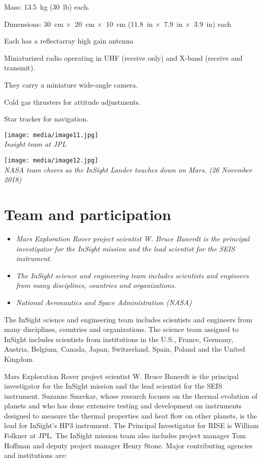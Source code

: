 Mass: 13.5~kg (30~lb) each.

Dimensions: 30~cm ×~20~cm ×~10~cm (11.8~in ×~7.9~in ×~3.9~in) each

Each has a reflectarray high gain antenna

Miniaturized radio operating in UHF (receive only) and X-band (receive
and transmit).

They carry a miniature wide-angle camera.

Cold gas thrusters for attitude adjustments.

Star tracker for navigation.

\texttt{[image: media/image11.jpg]}\\
\emph{Insight team at JPL}

\texttt{[image: media/image12.jpg]}\\
\emph{NASA team cheers as the InSight Lander touches down on Mars. (26
November 2018)}

\section{Team and participation}\label{team-and-participation}

\begin{itemize}
\item
  \emph{Mars Exploration Rover project scientist W. Bruce Banerdt is the
  principal investigator for the InSight mission and the lead scientist
  for the SEIS instrument.}
\item
  \emph{The InSight science and engineering team includes scientists and
  engineers from many disciplines, countries and organizations.}
\item
  \emph{National Aeronautics and Space Administration (NASA)}
\end{itemize}

The InSight science and engineering team includes scientists and
engineers from many disciplines, countries and organizations. The
science team assigned to InSight includes scientists from institutions
in the U.S., France, Germany, Austria, Belgium, Canada, Japan,
Switzerland, Spain, Poland and the United Kingdom.

Mars Exploration Rover project scientist W. Bruce Banerdt is the
principal investigator for the InSight mission and the lead scientist
for the SEIS instrument. Suzanne Smrekar, whose research focuses on the
thermal evolution of planets and who has done extensive testing and
development on instruments designed to measure the thermal properties
and heat flow on other planets, is the lead for InSight's HP3
instrument. The Principal Investigator for RISE is William Folkner at
JPL. The InSight mission team also includes project manager Tom Hoffman
and deputy project manager Henry Stone. Major contributing agencies and
institutions are:

